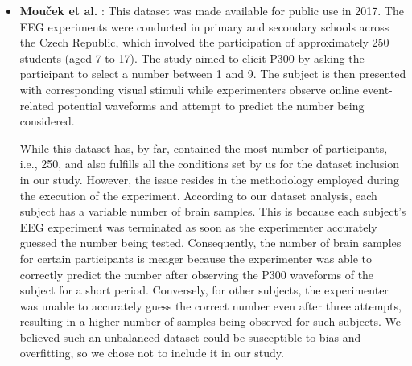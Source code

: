 \begin{itemize}
\item \textbf{Mouček et al.} \cite{mouvcek2017event}: This dataset was made available for public use in 2017. The EEG experiments were conducted in primary and secondary schools across the Czech Republic, which involved the participation of approximately 250 students (aged 7 to 17). The study aimed to elicit P300 by asking the participant to select a number between 1 and 9. The subject is then presented with corresponding visual stimuli while experimenters observe online event-related potential waveforms and attempt to predict the number being considered.     
\smallskip

While this dataset has, by far, contained the most number of participants, i.e., 250, and also fulfills all the conditions set by us for the dataset inclusion in our study. However, the issue resides in the methodology employed during the execution of the experiment. According to our dataset analysis, each subject has a variable number of brain samples. This is because each subject's EEG experiment was terminated as soon as the experimenter accurately guessed the number being tested. Consequently, the number of brain samples for certain participants is meager because the experimenter was able to correctly predict the number after observing the P300 waveforms of the subject for a short period. Conversely, for other subjects, the experimenter was unable to accurately guess the correct number even after three attempts, resulting in a higher number of samples being observed for such subjects. We believed such an unbalanced dataset could be susceptible to bias and overfitting, so we chose not to include it in our study. 




\end{itemize}
